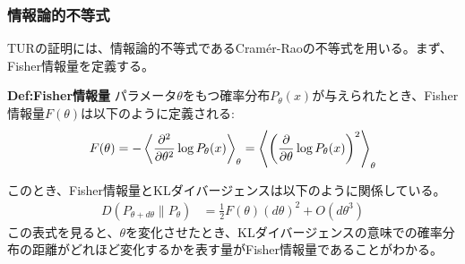 \documentclass[a4paper,11pt]{jsarticle}
\numberwithin{equation}{section}
\begin{document}
\noindent
\subsubsection{情報論的不等式}
TURの証明には、情報論的不等式であるCram\'er-Raoの不等式を用いる。まず、Fisher情報量を定義する。
\begin{itembox}[l]{\textbf{Def:Fisher情報量}}
    パラメータ$\theta$をもつ確率分布$P_{\theta}(x)$が与えられたとき、Fisher情報量$F(\theta)$は以下のように定義される:
    \begin{align}
        F(\theta) = -\ev{\pdv[2]{\theta} \log P_{\theta}(x)}_{\theta} =\ev{\qty(\pdv{\theta} \log P_{\theta}(x))^2}_{\theta}
    \end{align}
\end{itembox}
このとき、Fisher情報量とKLダイバージェンスは以下のように関係している。
\begin{align}
    D(P_{\theta + d\theta} \| P_{\theta})
    &= \frac{1}{2} F(\theta) (d\theta)^2 + O(d\theta^3)
\end{align}
この表式を見ると、$\theta$を変化させたとき、KLダイバージェンスの意味での確率分布の距離がどれほど変化するかを表す量がFisher情報量であることがわかる。\\
\end{document}
